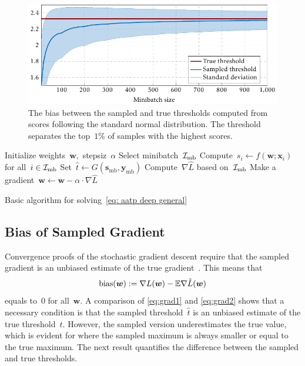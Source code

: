 \begin{figure}
  \centering
  \includegraphics[width = \linewidth]{images/deep_threshold_bias.pdf}
  \caption{The bias between the sampled and true thresholds computed from scores following the standard normal distribution. The threshold separates the top~$1\%$ of samples with the highest scores.}
  \label{fig:thresholds1}
\end{figure}

\begin{algorithm}
  \centering
  \begin{algorithmic}[1]
    \State Initialize weights~$\bm{w},$ stepsiz~$\alpha$
    \Repeat
    \State Select minibatch~$\mathcal{I}_{\text{mb}}$
    \State Compute~$s_i \gets f(\bm{w};\bm{x}_i)$ for all~$i \in \mathcal{I}_{\text{mb}}$
    \State Set~$\hat{t} \gets G(\bm{s}_{\text{mb}}, \bm{y}_{\text{mb}})$
    \State Compute~$\nabla \hat{L}$ based on~$\mathcal{I}_{\text{mb}}$
    \State Make a gradient~$\bm{w} \gets \bm{w} - \alpha \cdot \nabla \hat{L}$
  \end{algorithmic}
  \caption{Basic algorithm for solving~\eqref{eq: aatp deep general}}
  \label{alg: deep basic}
\end{algorithm}

\subsection{Bias of Sampled Gradient}

Convergence proofs of the stochastic gradient descent require that the sampled gradient is an unbiased estimate of the true gradient~\cite{bottou2018optimization}. This means that
\begin{equation}\label{eq:defin_bias}
  \operatorname{bias}(\bm{w}) := \nabla L(\bm{w}) - \mathbb{E} \nabla \hat{L}(\bm{w})
\end{equation}
equals to~$0$ for all~$\bm{w}$. A comparison of \eqref{eq:grad1} and \eqref{eq:grad2} shows that a necessary condition is that the sampled threshold~$\hat{t}$ is an unbiased estimate of the true threshold~$t$. However, the sampled version underestimates the true value, which is evident for \TopPush where the sampled maximum is always smaller or equal to the true maximum. The next result quantifies the difference between the sampled and true thresholds.

